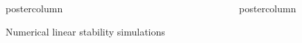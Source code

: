 \documentclass[final,hyperref={pdfpagelabels=false}]{beamer}
\newlength{\columnheight}
\begin{document}
\begin{frame}
\begin{columns}
\begin{column}{.49\textwidth}
\begin{beamercolorbox}[center,wd=\textwidth]{postercolumn}
\begin{minipage}[T]{.95\textwidth}
{\begin{block}{{\Large Numerical linear stability simulations}}
%
%

                   
            \end{block}
            \vfill
          }
        \end{minipage}
      \end{beamercolorbox}
    \end{column}
    
    \begin{column}{.49\textwidth}
      \begin{beamercolorbox}[center,wd=\textwidth]{postercolumn}
        \begin{minipage}[T]{.95\textwidth} %
          \parbox[t][\columnheight]{\textwidth}{ %
            

}
\end{minipage}
\end{beamercolorbox}
\end{column}
\end{columns}
\end{frame}
\end{document}

